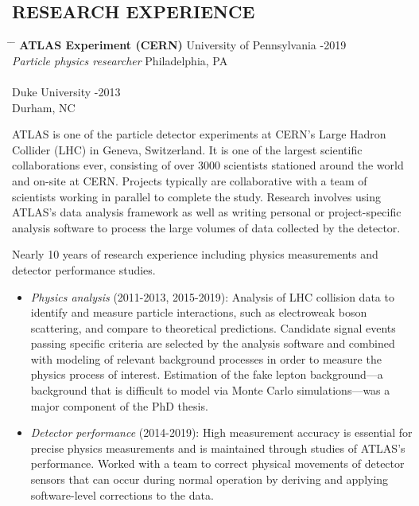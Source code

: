 \documentclass{res}
\begin{document}
\begin{resume}
\section{RESEARCH EXPERIENCE}\vspace{-5pt}
   \begin{tabbing}
   \hspace{2.5in}\= \hspace{2.85in} \= \kill %
    {\bf ATLAS Experiment (CERN)} \>University of Pennsylvania -2019\\
    {\it Particle physics researcher} \> Philadelphia, PA \\
    \\
    \> Duke University -2013 \\
    \> Durham, NC
   \end{tabbing}\vspace{-18pt}
   ATLAS is one of the particle detector experiments at CERN's Large Hadron Collider (LHC) in Geneva, Switzerland. 
   It is one of the largest scientific collaborations ever, consisting of over 3000 scientists stationed around the world and on-site at CERN.
   Projects typically are collaborative with a team of scientists working in parallel to complete the study.
   Research involves using ATLAS's data analysis framework as well as writing personal or project-specific analysis software to process the large volumes of data collected by the detector.

   Nearly 10 years of research experience including physics measurements and detector performance studies.
   \begin{itemize}
     \item {\it Physics analysis} (2011-2013, 2015-2019): Analysis of LHC collision data to identify and measure particle interactions, such as electroweak boson scattering, and compare to theoretical predictions.
           Candidate signal events passing specific criteria are selected by the analysis software and combined with modeling of relevant background processes in order to measure the physics process of interest.
           Estimation of the fake lepton background---a background that is difficult to model via Monte Carlo simulations---was a major component of the PhD thesis.
     \item {\it Detector performance} (2014-2019): High measurement accuracy is essential for precise physics measurements and is maintained through studies of ATLAS's performance.
           Worked with a team to correct physical movements of detector sensors that can occur during normal operation by deriving and applying software-level corrections to the data.
   \end{itemize}


\end{resume}
\end{document}
